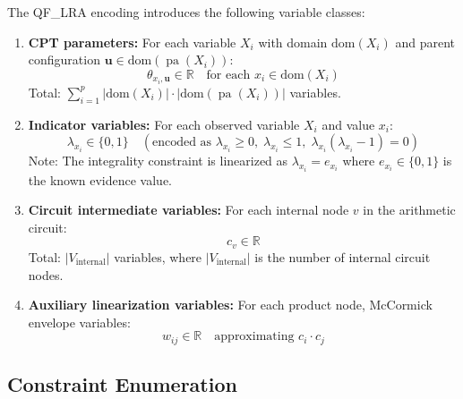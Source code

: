 \documentclass[11pt]{article}
\DeclareMathOperator{\pa}{pa}
\begin{document}
The QF\_LRA encoding introduces the following variable classes:

\begin{enumerate}[nosep]
  \item \textbf{CPT parameters:} For each variable $X_i$ with domain $\text{dom}(X_i)$ and parent configuration $\mathbf{u} \in \text{dom}(\pa(X_i))$:
  \[
    \theta_{x_i, \mathbf{u}} \in \mathbb{R} \quad \text{for each } x_i \in \text{dom}(X_i)
  \]
  Total: $\sum_{i=1}^p |\text{dom}(X_i)| \cdot |\text{dom}(\pa(X_i))|$ variables.

  \item \textbf{Indicator variables:} For each observed variable $X_i$ and value $x_i$:
  \[
    \lambda_{x_i} \in \{0, 1\} \quad (\text{encoded as } \lambda_{x_i} \geq 0,\; \lambda_{x_i} \leq 1,\; \lambda_{x_i}(\lambda_{x_i} - 1) = 0)
  \]
  Note: The integrality constraint is linearized as $\lambda_{x_i} = e_{x_i}$ where $e_{x_i} \in \{0,1\}$ is the known evidence value.

  \item \textbf{Circuit intermediate variables:} For each internal node $v$ in the arithmetic circuit:
  \[
    c_v \in \mathbb{R}
  \]
  Total: $|V_{\text{internal}}|$ variables, where $|V_{\text{internal}}|$ is the number of internal circuit nodes.

  \item \textbf{Auxiliary linearization variables:} For each product node, McCormick envelope variables:
  \[
    w_{ij} \in \mathbb{R} \quad \text{approximating } c_i \cdot c_j
  \]
\end{enumerate}

\subsection{Constraint Enumeration}
\end{document}

